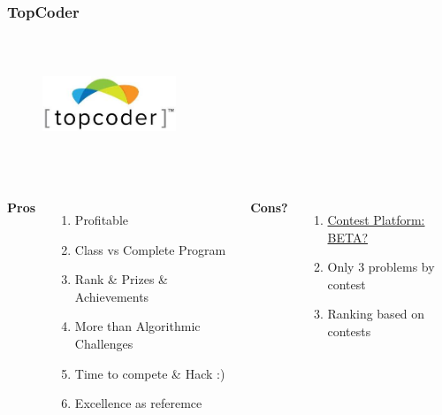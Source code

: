 \documentclass{beamer}
\begin{document}
\begin{frame}
	\frametitle{TopCoder}
	\begin{figure}[t]
		\href{https://arena.topcoder.com/index.html}{\includegraphics[width=4cm,height=4cm,keepaspectratio]{images/judges/topcoder}}
	\end{figure}
	
	\begin{columns}[c] %
		\textbf{Pros}
		\begin{enumerate}
			\item Profitable 
			\item Class vs Complete Program 
			\item Rank \& Prizes \& Achievements
			\item More than Algorithmic Challenges
			\item Time to compete \& Hack :)
			\item Excellence as referemce
		\end{enumerate}
		\textbf{Cons?}
		\begin{enumerate}
			\item \href{https://arena.topcoder.com/index.html}{Contest Platform: BETA?}
			\item Only 3 problems by contest
			\item Ranking based on contests
		\end{enumerate}
	\end{columns}

\end{frame}
\end{document}
